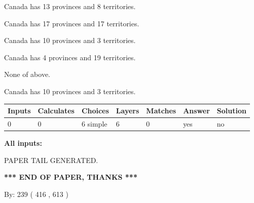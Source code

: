 \documentclass[12pt]{article}
\begin{document}
 
Canada has  13 provinces and  8 territories.
 
 
Canada has  17 provinces and  17 territories.
 
 
Canada has 10  provinces and 3 territories.
 
 
Canada has   4 provinces and  19 territories.
 
 
 None of above.
 
 
\noindent{}
 
 
Canada has 10  provinces and 3 territories.
 
 
\noindent{}
 
 
   
   
   
   
\noindent\begin{tabular}{|l|l|l|l|l|l|l|}
 \hline
Inputs & Calculates & Choices & Layers & Matches & Answer & Solution \\ \hline
 0  & 
 0  & 
 6
  simple  
  & 
 6  & 
 0  & 
  yes & 
  no 
  \\ \hline
 \end{tabular}
   
   
   
   
\noindent{}
   
   
   
   
\noindent\vspace{0.1in}\hspace{-0.08in} {\textbf{\Large{All inputs: }}}
   
   
   
   
   
   
 \vspace{0.2in}
 
   
   
\vspace{2.0in} PAPER TAIL GENERATED.
   
   
   
   
\vspace{1.0in} 
{\textbf{\large{ *** END OF PAPER, THANKS *** }}} 
   
   
\hspace{1.0in} By: 
 239 ( 416 ,  613 )
   
\end{document}
